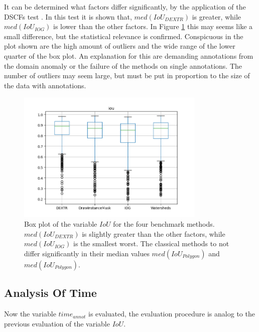 It can be determined what factors differ significantly, by the application of the DSCFs  test \cite{CF91-dscf}.
In this test it is shown that, $ med \left( IoU_{DEXTR} \right) $ is greater, while $ med \left( IoU_{IOG} \right) $ is lower than the other factors. 
In Figure \ref{fig:ch5:sec1:iou_box_plot} this may seems like a small difference, but the statistical relevance is confirmed.
Conspicuous in the plot shown are the high amount of outliers and the wide range of the lower quarter of the box plot.
An explanation for this are demanding annotations from the domain anomaly or the failure of the methods on single annotations.
The number of outliers may seem large, but must be put in proportion to the size of the data with \getNumberBenchmarkAnnotations \space annotations.

\begin{figure}
	\centering
	\includegraphics[width=0.8\textwidth]{figures/chap51_boxplot_iou.png}
	\caption[Box plots method on $ IoU $]{
		Box plot of the variable $ IoU $ for the four benchmark methods.
		$ med \left( IoU_{DEXTR} \right) $ is slightly greater than the other factors, while $ med \left( IoU_{IOG} \right) $ is the smallest worst.
		The classical methods to not differ significantly in their median values $ med \left( IoU_{Polygon} \right) $ and $ med \left( IoU_{Polygon} \right) $.
	} \label{fig:ch5:sec1:iou_box_plot}
\end{figure}



\subsection{Analysis Of Time}\label{ord:ch5:sec1:subsec3}
Now the variable $time_{annot}$ is evaluated, the evaluation procedure is analog to the previous evaluation of the variable $IoU$.
